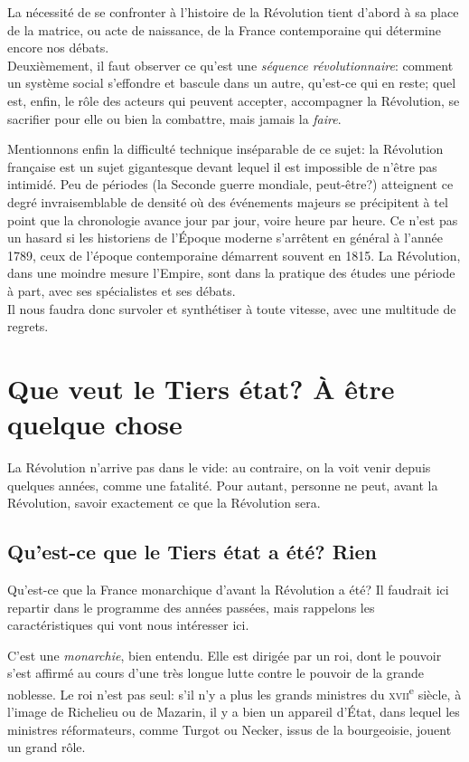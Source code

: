 \documentclass[
  french,
  letterpaper,
  DIV=11,
  numbers=noendperiod]{scrartcl}
\begin{document}
La nécessité de se confronter à l'histoire de la Révolution tient
d'abord à sa place de la matrice, ou acte de naissance, de la France
contemporaine qui détermine encore nos débats.\\
Deuxièmement, il faut observer ce qu'est une \emph{séquence
révolutionnaire}: comment un système social s'effondre et bascule dans
un autre, qu'est-ce qui en reste; quel est, enfin, le rôle des acteurs
qui peuvent accepter, accompagner la Révolution, se sacrifier pour elle
ou bien la combattre, mais jamais la \emph{faire}.

Mentionnons enfin la difficulté technique inséparable de ce sujet: la
Révolution française est un sujet gigantesque devant lequel il est
impossible de n'être pas intimidé. Peu de périodes (la Seconde guerre
mondiale, peut-être?) atteignent ce degré invraisemblable de densité où
des événements majeurs se précipitent à tel point que la chronologie
avance jour par jour, voire heure par heure. Ce n'est pas un hasard si
les historiens de l'Époque moderne s'arrêtent en général à l'année 1789,
ceux de l'époque contemporaine démarrent souvent en 1815. La Révolution,
dans une moindre mesure l'Empire, sont dans la pratique des études une
période à part, avec ses spécialistes et ses débats.\\
Il nous faudra donc survoler et synthétiser à toute vitesse, avec une
multitude de regrets.

\section{Que veut le Tiers état? À être quelque
chose}\label{que-veut-le-tiers-uxe9tat-uxe0-uxeatre-quelque-chose}

La Révolution n'arrive pas dans le vide: au contraire, on la voit venir
depuis quelques années, comme une fatalité. Pour autant, personne ne
peut, avant la Révolution, savoir exactement ce que la Révolution sera.

\subsection{Qu'est-ce que le Tiers état a été?
Rien}\label{quest-ce-que-le-tiers-uxe9tat-a-uxe9tuxe9-rien}

Qu'est-ce que la France monarchique d'avant la Révolution a été? Il
faudrait ici repartir dans le programme des années passées, mais
rappelons les caractéristiques qui vont nous intéresser ici.

C'est une \emph{monarchie}, bien entendu. Elle est dirigée par un roi,
dont le pouvoir s'est affirmé au cours d'une très longue lutte contre le
pouvoir de la grande noblesse. Le roi n'est pas seul: s'il n'y a plus
les grands ministres du \textsc{xvii}\textsuperscript{e} siècle, à
l'image de Richelieu ou de Mazarin, il y a bien un appareil d'État, dans
lequel les ministres réformateurs, comme Turgot ou Necker, issus de la
bourgeoisie, jouent un grand rôle.
\end{document}
